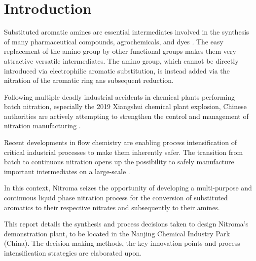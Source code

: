 \section{Introduction} %

Substituted aromatic amines are essential intermediates involved in the synthesis of many pharmaceutical compounds, agrochemicals, and dyes \cite{vogt_amines_2000}. The easy replacement of the amino group by other functional groups makes them very attractive versatile intermediates. The amino group, which cannot be directly introduced via electrophilic aromatic substitution, is instead added via the nitration of the aromatic ring ans subsequent reduction.

Following multiple deadly industrial accidents in chemical plants performing batch nitration, especially the 2019 Xiangshui chemical plant explosion, Chinese authorities are actively attempting to strengthen the control and management of nitration manufacturing \cite{el_diario_china_2019}.

Recent developments in flow chemistry are enabling process intensification of critical industrial processes to make them inherently safer. The transition from batch to continuous nitration opens up the possibility to safely manufacture important intermediates on a large-scale \cite{safety}.

In this context, Nitroma seizes the opportunity of developing a multi-purpose and continuous liquid phase nitration process for the conversion of substituted aromatics to their respective nitrates and subsequently to their amines. 

This report details the synthesis and process decisions taken to design Nitroma’s demonstration plant, to be located in the Nanjing Chemical Industry Park (China). The decision making methods, the key innovation points and process intensification strategies are elaborated upon.

